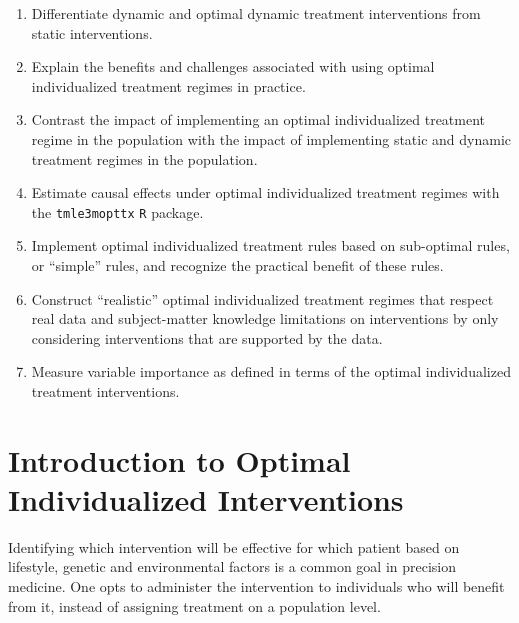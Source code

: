\documentclass[
  12pt, krantz2,
]{book}
\newcommand{\passthrough}[1]{#1}
\providecommand{\tightlist}{%
  \setlength{\itemsep}{0pt}\setlength{\parskip}{0pt}}
\theoremstyle{definition}
\theoremstyle{definition}
\theoremstyle{definition}
\newcommand{\1}{\mathbbm{1}}
\begin{document}
\begin{enumerate}
\def\labelenumi{\arabic{enumi}.}
\tightlist
\item
  Differentiate dynamic and optimal dynamic treatment interventions from static
  interventions.
\item
  Explain the benefits and challenges associated with using optimal
  individualized treatment regimes in practice.
\item
  Contrast the impact of implementing an optimal individualized treatment
  regime in the population with the impact of implementing static and dynamic
  treatment regimes in the population.
\item
  Estimate causal effects under optimal individualized treatment regimes with
  the \passthrough{\lstinline!tmle3mopttx!} \passthrough{\lstinline!R!} package.
\item
  Implement optimal individualized treatment rules based on sub-optimal
  rules, or ``simple'' rules, and recognize the practical benefit of these rules.
\item
  Construct ``realistic'' optimal individualized treatment regimes that respect
  real data and subject-matter knowledge limitations on interventions by
  only considering interventions that are supported by the data.
\item
  Measure variable importance as defined in terms of the optimal individualized
  treatment interventions.
\end{enumerate}

\hypertarget{introduction-to-optimal-individualized-interventions}{%
\section{Introduction to Optimal Individualized Interventions}\label{introduction-to-optimal-individualized-interventions}}

Identifying which intervention will be effective for which patient
based on lifestyle, genetic and environmental factors is a common goal in
precision medicine. One opts to administer the intervention to individuals
who will benefit from it, instead of assigning treatment on a population level.
\end{document}
